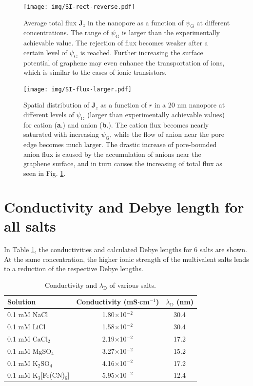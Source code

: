 \documentclass[manuscript=suppinfo,email=true, hyperref=true, keywords=false]{achemso}
\newcommand{\Fig}{Fig.}
\begin{document}
\begin{figure}[htbp]
  \centering
  \texttt{[image: img/SI-rect-reverse.pdf]}
  \caption{Average total flux $\boldsymbol{J}_{z}$ in the nanopore as
    a function of $\psi_{\mathrm{G}}$ at different concentrations. The
    range of $\psi_{\mathrm{G}}$ is larger than the experimentally
    achievable value. The rejection of flux becomes weaker after a
    certain level of $\psi_{\mathrm{G}}$ is reached. Further
    increasing the surface potential of graphene may even enhance the
    transportation of ions, which is similar to the cases of ionic
    transistors.}
  \label{fig:reverse}
\end{figure}


\begin{figure}[htbp]
  \centering
  \texttt{[image: img/SI-flux-larger.pdf]}
  \caption{Spatial distribution of $\boldsymbol{J}_{z}$ as a function
    of $r$ in a 20 nm nanopore at different levels of
    $\psi_{\mathrm{G}}$ (larger than experimentally achievable values)
    for cation (\textbf{a}.) and anion (\textbf{b}.). The cation flux
    becomes nearly saturated with increasing $\psi_{\mathrm{G}}$,
    while the flow of anion near the pore edge becomes much
    larger. The drastic increase of pore-bounded anion flux is caused
    by the accumulation of anions near the graphene surface, and in
    turn causes the increasing of total flux as seen in \Fig
    \ref{fig:reverse}.}
  \label{fig:large-V}
\end{figure}
\clearpage{}
\fi

\section{Conductivity and Debye length for all salts}
\label{sec:salts}
In Table \ref{tab:conductivity}, the conductivities and calculated Debye
lengths for 6 salts are shown. At the same concentration, the higher
ionic strength of the multivalent salts leads to a reduction of the
respective Debye lengths.

\begin{table}[htbp]
  \centering
  \begin{tabular}{lcc}
    \hline
    Solution & Conductivity (mS$\cdot$cm$^{-1}$) & $\lambda_{\mathrm{D}}$ (nm) \\
    \hline
    0.1 mM NaCl &1.80$\times$10$^{-2}$  &30.4\\
    0.1 mM LiCl &1.58$\times$10$^{-2}$ &30.4\\
    0.1 mM CaCl$_{2}$&  2.19$\times$10$^{-2}$ &17.2\\
    0.1 mM MgSO$_{4}$   &3.27$\times$10$^{-2}$ &15.2\\
    0.1 mM K$_{2}$SO$_{4}$      &4.16$\times$10$^{-2}$ &17.2\\
    0.1 mM K$_{3}$[Fe(CN)$_{6}$]&       5.95$\times$10$^{-2}$  &12.4\\
    \hline
  \end{tabular}
  \caption{Conductivity and $\lambda_{\mathrm{D}}$ of various salts.}
  \label{tab:conductivity}
\end{table}


\section*{}
\label{sec:ref}

\end{document}
